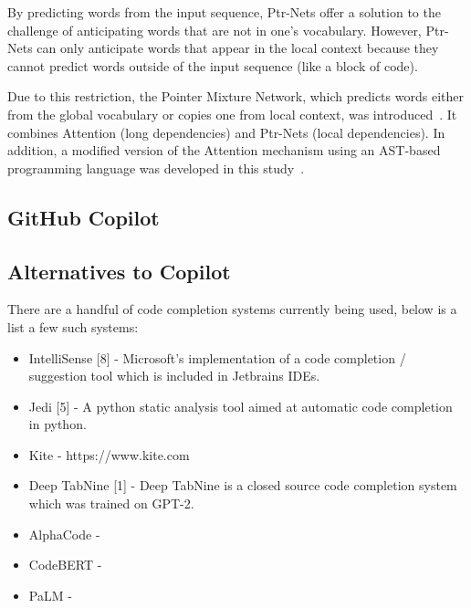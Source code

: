 By predicting words from the input sequence, Ptr-Nets offer a solution to the challenge of anticipating words that are not in one's vocabulary. However, Ptr-Nets can only anticipate words that appear in the local context because they cannot predict words outside of the input sequence (like a block of code).

Due to this restriction, the Pointer Mixture Network, which predicts words either from the global vocabulary or copies one from local context, was introduced~\cite{ccnlm}. It combines Attention (long dependencies) and Ptr-Nets (local dependencies). In addition, a modified version of the Attention mechanism using an AST-based programming language was developed in this study~\cite{ccnlm}.

\subsection{GitHub Copilot}



\subsection{Alternatives to Copilot}
There are a handful of code completion systems currently being used, below is a list a few such systems:

\begin{itemize}
    \item IntelliSense [8] - Microsoft’s implementation of a code completion / suggestion tool which is included in Jetbrains IDEs.
    \item Jedi [5] - A python static analysis tool aimed at automatic code completion in python.
    \item Kite - https://www.kite.com
    \item Deep TabNine [1] - Deep TabNine is a closed source code completion system which
was trained on GPT-2.
    \item AlphaCode - 
    \item CodeBERT -
    \item PaLM - 
\end{itemize}
